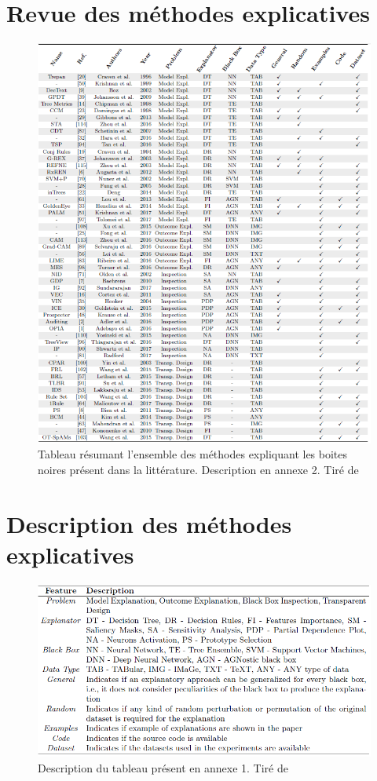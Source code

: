 \begin{appendices}

\section{Revue des méthodes explicatives}
\begin{figure}[h]
\centering
\includegraphics[scale=1.01]{src_img/tabSummary.PNG}
\caption{Tableau résumant l'ensemble des méthodes expliquant les boites noires présent dans la littérature. Description en annexe 2. Tiré de \cite{surveyExplaining}}
\label{tabSummary}
\end{figure}

\newpage

\section{Description des méthodes explicatives}
\begin{figure}[h]
\centering
\includegraphics[scale=1.01]{src_img/descSummary.PNG}
\caption{Description du tableau présent en annexe 1. Tiré de \cite{surveyExplaining}}
\label{descSummary}
\end{figure}

\end{appendices}